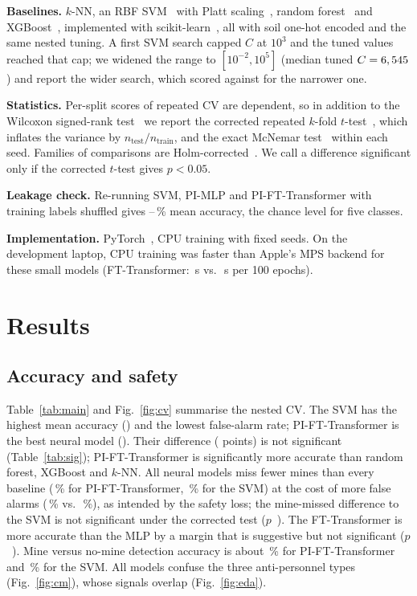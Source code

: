 \documentclass[conference]{IEEEtran}
\newcommand{\pift}{PI-FT-Transformer}
\begin{document}
\textbf{Baselines.} $k$-NN, an RBF SVM~\cite{cortes1995} with Platt scaling~\cite{platt1999}, random forest~\cite{breiman2001} and XGBoost~\cite{chen2016}, implemented with scikit-learn~\cite{pedregosa2011}, all with soil one-hot encoded and the same nested tuning. A first SVM search capped $C$ at $10^3$ and the tuned values reached that cap; we widened the range to $[10^{-2},10^5]$ (median tuned $C=6,545$) and report the wider search, which scored \vAccSvm{} against \vAccSvmNarrow{} for the narrower one.

\textbf{Statistics.} Per-split scores of repeated CV are dependent, so in addition to the Wilcoxon signed-rank test~\cite{wilcoxon1945} we report the corrected repeated $k$-fold $t$-test~\cite{nadeau2003,bouckaert2004}, which inflates the variance by $n_\text{test}/n_\text{train}$, and the exact McNemar test~\cite{mcnemar1947} within each seed. Families of comparisons are Holm-corrected~\cite{holm1979}. We call a difference significant only if the corrected $t$-test gives $p<0.05$.

\textbf{Leakage check.} Re-running SVM, PI-MLP and \pift{} with training labels shuffled gives \vPermMin--\vPermMax\,\% mean accuracy, the chance level for five classes.

\textbf{Implementation.} PyTorch~\cite{paszke2019}, CPU training with fixed seeds. On the development laptop, CPU training was faster than Apple's MPS backend for these small models (FT-Transformer: \vDevFtCpu\,s vs.\ \vDevFtMps\,s per 100 epochs).

\section{Results}
\subsection{Accuracy and safety}
Table~\ref{tab:main} and Fig.~\ref{fig:cv} summarise the nested CV. The SVM has the highest mean accuracy (\vAccSvm) and the lowest false-alarm rate; \pift{} is the best neural model (\vAccPiFt). Their difference (\vDiffPiFtVsSvmAccuracy{} points) is not significant (Table~\ref{tab:sig}); \pift{} is significantly more accurate than random forest, XGBoost and $k$-NN. All neural models miss fewer mines than every baseline (\vMissPiFt\,\% for \pift, \vMissSvm\,\% for the SVM) at the cost of more false alarms (\vFaPiFt\,\% vs.\ \vFaSvm\,\%), as intended by the safety loss; the mine-missed difference to the SVM is not significant under the corrected test ($p$~\vPtPiFtVsSvmMineMissed). The FT-Transformer is more accurate than the MLP by a margin that is suggestive but not significant ($p$~\vPtFtVsMlpAccuracy). Mine versus no-mine detection accuracy is about \vDetPiFt\,\% for \pift{} and \vDetSvm\,\% for the SVM. All models confuse the three anti-personnel types (Fig.~\ref{fig:cm}), whose signals overlap (Fig.~\ref{fig:eda}).
\end{document}
